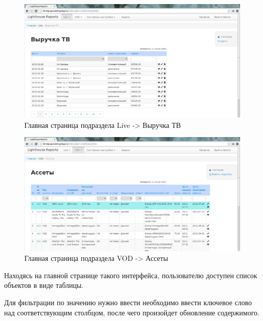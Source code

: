\begin{figure}[!ht]
\begin{center}
\hspace*{-1cm} \includegraphics[scale=0.35, trim=0mm 0mm 0mm 10mm, clip]{../resources/screens/tv_revenue.png}
\caption{Главная страница подраздела Live -> Выручка ТВ}
\end{center}
\end{figure}

\begin{figure}[!ht]
\begin{center}
\hspace*{-1cm} \includegraphics[scale=0.35, trim=0mm 0mm 0mm 10mm, clip]{../resources/screens/assets.png}
\caption{Главная страница подраздела VOD -> Ассеты}
\end{center}
\end{figure}

Находясь на главной странице такого интерфейса, пользователю доступен список объектов в виде таблицы.

Для фильтрации по значению нужно ввести необходимо ввести ключевое слово над соответствующим столбцом,
после чего произойдет обновление содержимого.

